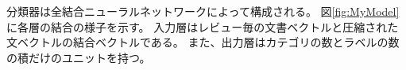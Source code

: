 \documentclass{ttisummary}
\begin{document}
分類器は全結合ニューラルネットワークによって構成される。
図\ref{fig:MyModel}に各層の結合の様子を示す。
入力層はレビュー毎の文書ベクトルと圧縮された文ベクトルの結合ベクトルである。
また、出力層はカテゴリの数とラベルの数の積だけのユニットを持つ。
\end{document}
